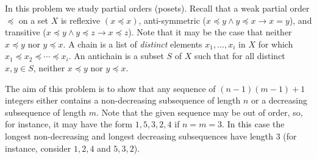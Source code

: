 \documentclass[12pt,twoside]{article}
\begin{document}
\begin{problem}{15}
In this problem we study partial orders (posets). Recall that a weak partial order $\preceq$ on a set $X$ is reflexive $(x \preceq x)$, anti-symmetric ($x \preceq y \wedge y \preceq x \rightarrow x = y$), and transitive ($x \preceq y \wedge y \preceq z \rightarrow x \preceq z$). Note that it may be the case that neither $x \preceq y$ nor $y \preceq x$. A chain is a list of {\it distinct} elements $x_1, \ldots, x_i$ in $X$ for which $x_1 \preceq x_2 \preceq \cdots \preceq x_i$. An antichain is a subset $S$ of $X$ such that for all distinct $x, y \in S$, neither $x \preceq y$ nor $y \preceq x$. 

The aim of this problem is to show that any sequence of $(n-1)(m-1) + 1$ integers either contains a non-decreasing subsequence of length $n$ or a decreasing subsequence of length $m$. Note that the given sequence may be out of order, so, for instance, it may have the form $1, 5, 3, 2, 4$ if $n = m = 3$. In this case the longest non-decreasing and longest decreasing subsequences have length $3$ (for instance, consider $1, 2, 4$ and $5, 3, 2$).



\bparts


\end{problem}
\end{document}
